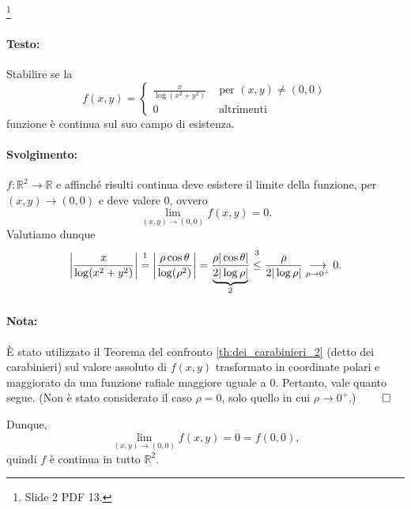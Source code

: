 \begin{example}\footnote{Slide 2 PDF 13.}
	\paragraph{Testo:} Stabilire se la
	\begin{equation*}
		f(x,y)=
		\begin{cases}
			\frac{x}{\log(x^2+y^2)}&\text{ per } (x,y)\neq(0,0)\\
			0 &\text{ altrimenti}
		\end{cases}
	\end{equation*}
	funzione è continua sul suo campo di esistenza.
	\paragraph{Svolgimento:} $f:\mathbb{R}^2\rightarrow\mathbb{R}$ e affinché risulti continua deve esistere il limite della funzione, per $(x,y)\rightarrow(0,0)$ e deve valere 0, ovvero
	\begin{equation*}
		\lim_{(x,y)\rightarrow(0,0)}f(x,y)=0.
	\end{equation*}
	Valutiamo dunque
	\begin{equation*}
		\left|\frac{x}{\log(x^2+y^2)}\right|\overset{\footnotemark}{=} \left|\frac{\rho \cos\theta}{\log(\rho^2)}\right| = \frac{\rho|\cos\theta|}{\underbrace{2|\log\rho|}_{\footnotemark}}\overset{\footnotemark}{\leq} \frac{\rho}{2|\log\rho|}\underset{\rho\rightarrow0^+}{\longrightarrow}0 .
	\end{equation*}
	\addtocounter{footnote}{-2}
	
	
	
	\paragraph{Nota:} È stato utilizzato il Teorema del confronto \ref{th:dei_carabinieri_2} (detto dei carabinieri) sul valore assoluto di $f(x,y)$ trasformato in coordinate polari e maggiorato da una funzione rafiale maggiore uguale a 0. Pertanto, vale quanto segue. (Non è stato considerato il caso $\rho=0$, solo quello in cui $\rho\rightarrow 0^+$.) $\qed$
	
	\noindent Dunque,
	\begin{equation*}
		\lim_{(x,y)\rightarrow(0,0)} f(x,y) = 0 = f(0,0),
	\end{equation*}
	quindi $f$ è continua in tutto $\mathbb{R}^2$.
	
\end{example}

